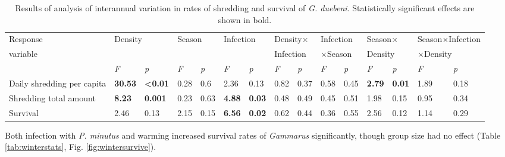 \begin{landscape}
\begin{table}[]
\caption[Results of linear and generalized linear models analysing the impact of interannual variation in rates of shredding and survival of \emph{G. duebeni}.]{Results of analysis of interannual variation in rates of shredding and survival of \emph{G. duebeni}. Statistically significant effects are shown in bold.}
\label{tab:seasonstats}
\begin{tabular}{lllllllllllllll} \toprule
Response & \multicolumn{2}{l}{Density} & \multicolumn{2}{l}{Season} & \multicolumn{2}{l}{Infection} & \multicolumn{2}{l}{Density$\times$} & \multicolumn{2}{l}{Infection} & \multicolumn{2}{l}{Season$\times$} & \multicolumn{2}{l}{Season$\times$Infection} \\ 
variable & \multicolumn{2}{l}{} & \multicolumn{2}{l}{} & \multicolumn{2}{l}{} & \multicolumn{2}{l}{Infection} & \multicolumn{2}{l}{$\times$Season} & \multicolumn{2}{l}{Density} & \multicolumn{2}{l}{$\times$Density} \\ \midrule
\textit{} & \textit{F} & \textit{p} & \textit{F} & \textit{p} & \textit{F} & \textit{p} & \textit{F} & \textit{p} & \textit{F} & \textit{p} & \textit{F} & \textit{p} & \textit{F} & \textit{p} \\
Daily shredding per capita & \textbf{30.53} & \textbf{<0.01} & 0.28 & 0.6 & 2.36 & 0.13 & 0.82 & 0.37 & 0.58 & 0.45 & \textbf{2.79} & \textbf{0.01} & 1.89 & 0.18 \\
Shredding total amount & \textbf{8.23} & \textbf{0.001} & 0.23 & 0.63 & \textbf{4.88} & \textbf{0.03} & 0.48 & 0.49 & 0.45 & 0.51 & 1.98 & 0.15 & 0.95 & 0.34 \\
Survival & 2.46 & 0.13 & 2.15 & 0.15 & \textbf{6.56} & \textbf{0.02} & 0.62 & 0.44 & 0.36 & 0.55 & 2.56 & 0.12 & 1.14 & 0.29\\ \bottomrule
\end{tabular}
\end{table}

\end{landscape}

Both infection with \emph{P. minutus} and warming increased survival rates of \emph{Gammarus} significantly, though group size had no effect (Table \ref{tab:winterstats}, Fig. \ref{fig:wintersurvive}).

